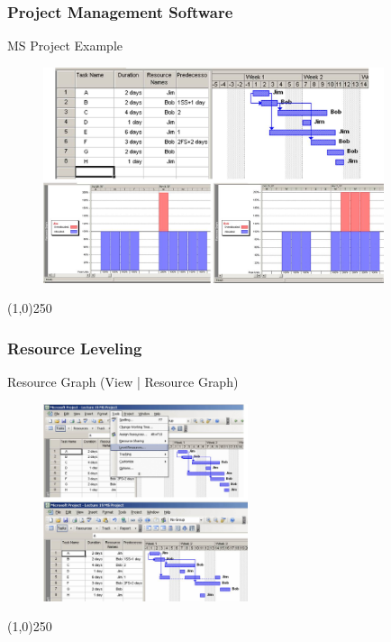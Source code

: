 \begin{frame}
\frametitle{Project Management Software}
MS Project Example
\begin{figure}
	\centering
		\includegraphics[width = 10cm]{images/msprojres.jpg}
	\label{fig:msprojres}
\end{figure}
\end{frame}
\begin{center}\line(1,0){250}\end{center}











\begin{frame}
\frametitle{Resource Leveling}
Resource Graph (View | Resource Graph)
\begin{figure}
	\centering
		\includegraphics[width = 6cm]{images/reslevel.jpg}
	\label{fig:reslevel}
\end{figure}
\end{frame}
\begin{center}\line(1,0){250}\end{center}






